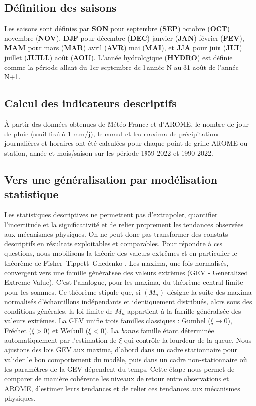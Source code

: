 \documentclass[
  article,
  nofooter,
  noheadings]{jss}
\begin{document}
\subsection{Définition des saisons}\label{duxe9finition-des-saisons}

Les saisons sont définies par \textbf{SON} pour septembre (\textbf{SEP})
octobre (\textbf{OCT}) novembre (\textbf{NOV}), \textbf{DJF} pour
décembre (\textbf{DEC}) janvier (\textbf{JAN}) février (\textbf{FEV}),
\textbf{MAM} pour mars (\textbf{MAR}) avril (\textbf{AVR}) mai
(\textbf{MAI}), et \textbf{JJA} pour juin (\textbf{JUI}) juillet
(\textbf{JUILL}) août (\textbf{AOU}). L'année hydrologique
(\textbf{HYDRO}) est définie comme la période allant du 1er septembre de
l'année N au 31 août de l'année N+1.

\subsection{Calcul des indicateurs
descriptifs}\label{calcul-des-indicateurs-descriptifs}

À partir des données obtenues de Météo-France et d'AROME, le nombre de
jour de pluie (seuil fixé à 1 mm/j), le cumul et les maxima de
précipitations journalières et horaires ont été calculées pour chaque
point de grille AROME ou station, année et mois/saison sur les période
1959-2022 et 1990-2022.

\subsection{Vers une généralisation par modélisation
statistique}\label{vers-une-guxe9nuxe9ralisation-par-moduxe9lisation-statistique}

Les statistiques descriptives ne permettent pas d'extrapoler, quantifier
l'incertitude et la significativité et de relier proprement les
tendances observées aux mécanismes physiques. On ne peut donc pas
transformer des constats descriptifs en résultats exploitables et
comparables. Pour répondre à ces questions, nous mobilisons la théorie
des valeurs extrêmes et en particulier le théorème de
Fisher--Tippett--Gnedenko \citep{coles2001introduction}. Les maxima, une
fois normalisés, convergent vers une famille généralisée des valeurs
extrêmes (GEV - Generalized Extreme Value). C'est l'analogue, pour les
maxima, du théorème central limite pour les sommes. Ce théorème stipule
que, si \((M_n)\) désigne la suite des maxima normalisés d'échantillons
indépendants et identiquement distribués, alors sous des conditions
générales, la loi limite de \(M_n\) appartient à la famille généralisée
des valeurs extrêmes. La GEV unifie trois familles classiques : Gumbel
(\(\xi \to 0\)), Fréchet (\(\xi > 0\)) et Weibull (\(\xi < 0\)). La
\emph{bonne} famille étant déterminée automatiquement par l'estimation
de \(\xi\) qui contrôle la lourdeur de la queue. Nous ajustons des lois
GEV aux maxima, d'abord dans un cadre stationnaire pour valider le bon
comportement du modèle, puis dans un cadre non‑stationnaire où les
paramètres de la GEV dépendent du temps. Cette étape nous permet de
comparer de manière cohérente les niveaux de retour entre observations
et AROME, d'estimer leurs tendances et de relier ces tendances aux
mécanismes physiques.
\end{document}
